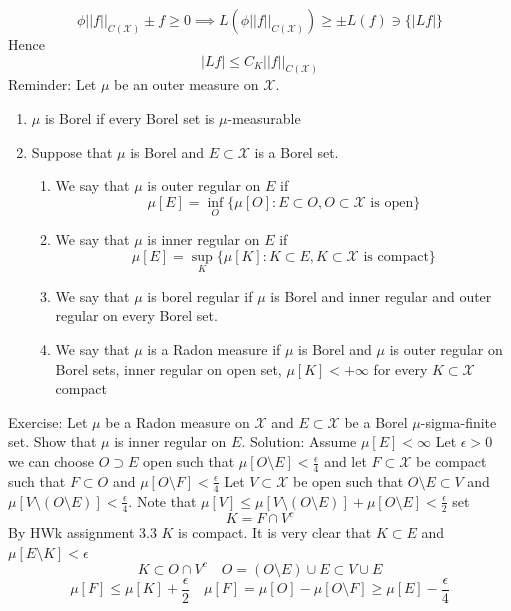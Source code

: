 \documentclass[11pt]{article}
\begin{document}
 \[
     \phi||f||_{C( \mathcal{X})}  \pm f \ge 0 \implies L(\phi ||f||_{C( \mathcal{X})}) \ge \pm L(f) \ni \{|Lf|\}
\] 
Hence
\[
    |Lf| \le C_K ||f||_{C( \mathcal{X})}
\] 
Reminder:  Let $\mu$ be an outer measure on $ \mathcal{X}$.
\begin{enumerate}
    \item $\mu$ is Borel if every Borel set is $\mu$-measurable
    \item Suppose that $\mu$ is Borel and  $E \subset \mathcal{X}$ is a Borel set.
        \begin{enumerate}
            \item We say that $\mu$ is outer regular on $ E$ if
                 \[
                     \mu[E] = \inf_{O}\{\mu[O] : E \subset O, O \subset \mathcal{X} \text{ is open}\}
                \] 
            \item We say that  $\mu$ is inner regular on $ E$ if
                \[
                    \mu[E] = \sup_{K}\{\mu[K] : K \subset E, K \subset \mathcal{X} \text{ is compact}\}
                \] 
            \item We say that $\mu$ is borel regular if $\mu$ is Borel and inner regular
                and outer regular on every Borel set.
            \item We say that $\mu$ is a Radon measure if $\mu$ is Borel and
                $\mu$ is outer regular on Borel sets, inner regular on open set, $\mu[K] < +\infty$ for every $K \subset \mathcal{X}$ compact 
        \end{enumerate}
\end{enumerate}
Exercise: Let $\mu$ be a Radon measure on $ \mathcal{X}$ and $ E \subset \mathcal{X}$ be a Borel $\mu$-sigma-finite set.
Show that $\mu$ is inner regular on $E$.
Solution: Assume  $\mu[E] < \infty$ Let $\epsilon > 0$ we can choose $O \supset E$ open such that  $\mu[O \setminus E] < \frac{\epsilon}{4}$ 
and let $F \subset \mathcal{X}$ be compact such that $F \subset O$ and $\mu[O \setminus F] < \frac{\epsilon}{4}$ Let $V \subset \mathcal{X}$ be open such that
$O \setminus E \subset V$ and $\mu[V \setminus (O \setminus E)] < \frac{\epsilon}{4}$. Note that $\mu[V] \le \mu[V \setminus (O \setminus E)] + \mu[O \setminus E] < \frac{\epsilon}{2}$ set
\[
    K = F \cap V^{c}
\] 
By HWk assignment 3.3 $K$ is compact. It is very clear that  $K \subset E$ and $\mu[E \setminus K] < \epsilon$
\[
K \subset O \cap V^{c} \quad O = (O \setminus E) \cup E \subset V \cup E
\] 
\[
    \mu[F] \le \mu[K] + \frac{\epsilon}{2} \quad \mu[F] = \mu[O] - \mu[O \setminus F] \ge \mu[E] - \frac{\epsilon}{4}
\] 
\end{document}
